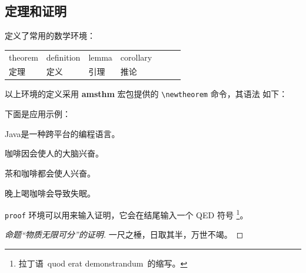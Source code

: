 \subsection{定理和证明}

\htuthesis{} 定义了常用的数学环境：
\begin{center}
\begin{tabular}{*{7}{l}}\hline
  theorem & definition & lemma & corollary &\\
  定理 & 定义 & 引理 & 推论 &\\\hline
\end{tabular}
\end{center}

以上环境的定义采用 \textbf{amsthm} 宏包提供的 \verb|\newtheorem| 命令，其语法
如下：

\begin{latex}
\newtheorem{环境名}[编号延续]{显示名}[编号层次]
\end{latex}

下面是应用示例：
\begin{definition}
Java是一种跨平台的编程语言。
\end{definition}

\begin{theorem}
咖啡因会使人的大脑兴奋。
\end{theorem}

\begin{lemma}
茶和咖啡都会使人兴奋。
\end{lemma}

\begin{corollary}
晚上喝咖啡会导致失眠。
\end{corollary}

\texttt{proof} 环境可以用来输入证明，它会在结尾输入一个 QED 符号
\footnote{拉丁语~quod erat demonstrandum~的缩写。}。

\begin{proof}[命题“物质无限可分”的证明]
一尺之棰，日取其半，万世不竭。
\end{proof}
